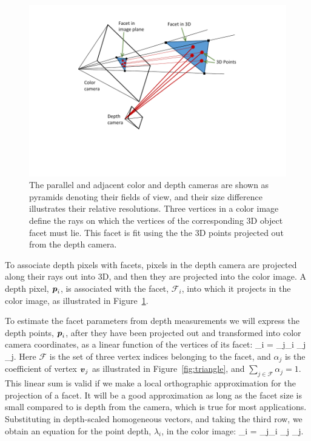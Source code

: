 \begin{figure}
\begin{center}
   \includegraphics[trim=80 70 70 20,clip,width=0.95\linewidth]{Figures/pointFittingConcept}
\end{center}
   \caption{The parallel and adjacent color and depth cameras are shown as pyramids denoting their fields of view, and their size difference illustrates their relative resolutions.  Three vertices in a color image define the rays on which the vertices of the corresponding $3$D object facet must lie.  This facet is fit using the the $3$D points projected out from the depth camera.}
\label{fig:facet}
\end{figure}

To associate depth pixels with facets, pixels in the depth camera are projected along their rays out into $3$D, and then they are projected into the color image.  A depth pixel, $\boldsymbol{p}_i$, is associated with the facet, $\mathcal{F}_i$, into which it projects in the color image, as illustrated in Figure~\ref{fig:facet}. 

To estimate the facet parameters from depth measurements we will express the depth points, $\boldsymbol{p}_i$, after they have been projected out and transformed into color camera coordinates, as a linear function of the vertices of its facet:
\beq  %
\point_i = \sum_{j\in{}_i} \alpha_j \vertex_j. \label{eq:point}
\eeq
Here $\mathcal{F}$ is the set of three vertex indices belonging to the facet, and $\alpha_j$ is the coefficient of vertex $\boldsymbol{v}_j$ as illustrated in Figure~\ref{fig:triangle}, and $\sum_{j\in\mathcal{F}}\alpha_j=1$.  This linear sum is valid if we make a local orthographic approximation for the projection of a facet.  It will be a good approximation as long as the facet size is small compared to is depth from the camera, which is true for most applications.  Substituting in depth-scaled homogeneous vectors, and taking the third row, we obtain an equation for the point depth, $\lambda_i$, in the color image:
\beq
\lambda_i = \sum_{j\in{}_i} \alpha_j \lambda_j. \label{eq:pointdepth}
\eeq

